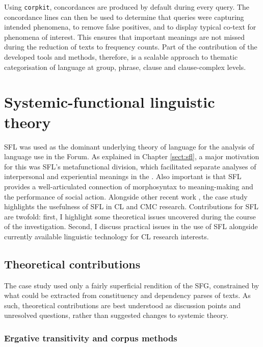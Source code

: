 Using \texttt{corpkit}, concordances are produced by default during every query. The concordance lines can then be used to determine that queries were capturing intended phenomena, to remove false positives, and to display typical co\hyp{}text for  phenomena of interest. This ensures that important meanings are not missed during the reduction of texts to frequency counts. Part of the contribution of the developed tools and methods, therefore, is a scalable approach to thematic categorisation of language at group, phrase, clause and clause\hyp{}complex levels.

\section{Systemic-functional linguistic theory}

\gls{SFL} was used as the dominant underlying theory of language for the analysis of language use in the \gls{Forum}. As explained in Chapter \ref{sect:sfl}, a major motivation for this was \gls{SFL}'s metafunctional division, which facilitated separate analyses of interpersonal and experiential meanings in the . Also important is that \gls{SFL} provides a well\hyp{}articulated connection of morphosyntax to meaning\hyp{}making and the performance of social action. Alongside other recent work \cite[e.g.][]{coffin_using_2013,hunston_systemic_2013}, the case study highlights the usefulness of \gls{SFL} in \gls{CL} and \gls{CMC} research. Contributions for \gls{SFL} are twofold: first, I highlight some theoretical issues uncovered during the course of the investigation. Second, I discuss practical issues in the use of \gls{SFL} alongside currently available linguistic technology for \gls{CL} research interests.

\subsection{Theoretical contributions}

The case study used only a fairly superficial rendition of the \gls{SFG}, constrained by what could be extracted from constituency and dependency parses of texts. As such, theoretical contributions are best understood as discussion points and unresolved questions, rather than suggested changes to systemic theory.

\subsubsection{Ergative transitivity and corpus methods}


